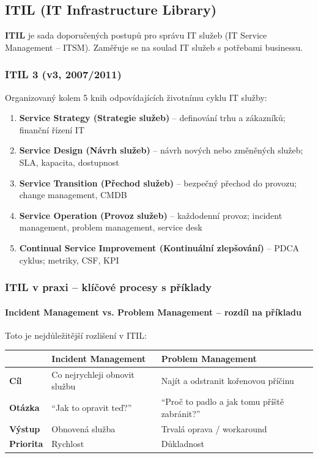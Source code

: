 \subsection{ITIL (IT Infrastructure Library)}

\textbf{ITIL} je sada doporučených postupů pro správu IT služeb (IT Service Management -- ITSM).
Zaměřuje se na soulad IT služeb s potřebami businessu.

\subsubsection{ITIL 3 (v3, 2007/2011)}

Organizovaný kolem 5 knih odpovídajících životnímu cyklu IT služby:

\begin{enumerate}
  \item \textbf{Service Strategy (Strategie služeb)} -- definování trhu a zákazníků; finanční řízení IT
  \item \textbf{Service Design (Návrh služeb)} -- návrh nových nebo změněných služeb; SLA, kapacita, dostupnost
  \item \textbf{Service Transition (Přechod služeb)} -- bezpečný přechod do provozu; change management, CMDB
  \item \textbf{Service Operation (Provoz služeb)} -- každodenní provoz; incident management, problem management,
    service desk
  \item \textbf{Continual Service Improvement (Kontinuální zlepšování)} -- PDCA cyklus; metriky, CSF, KPI
\end{enumerate}

\subsubsection{ITIL v praxi -- klíčové procesy s příklady}

\paragraph{Incident Management vs. Problem Management -- rozdíl na příkladu}

Toto je nejdůležitější rozlišení v ITIL:

\begin{center}
\begin{tabular}{p{2.2cm}p{5.2cm}p{5.2cm}}
\toprule
 & \textbf{Incident Management} & \textbf{Problem Management} \\
\midrule
\textbf{Cíl} & Co nejrychleji obnovit službu & Najít a odstranit kořenovou příčinu \\
\textbf{Otázka} & ``Jak to opravit teď?'' & ``Proč to padlo a jak tomu příště zabránit?'' \\
\textbf{Výstup} & Obnovená služba & Trvalá oprava / workaround \\
\textbf{Priorita} & Rychlost & Důkladnost \\
\bottomrule
\end{tabular}
\end{center}

